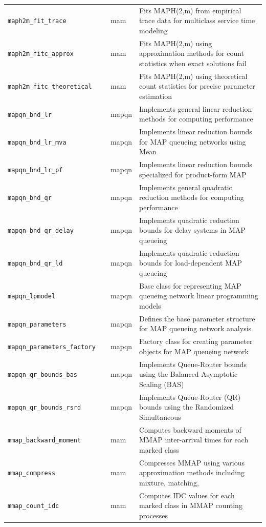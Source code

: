\begin{footnotesize}
\begin{longtable}{|p{0.4\linewidth}|p{0.1\linewidth}|p{0.5\linewidth}|}
\texttt{maph2m\_fit\_trace} & mam & Fits MAPH(2,m) from empirical trace data for multiclass service time modeling\\
\texttt{maph2m\_fitc\_approx} & mam & Fits MAPH(2,m) using approximation methods for count statistics when exact solutions fail\\
\texttt{maph2m\_fitc\_theoretical} & mam & Fits MAPH(2,m) using theoretical count statistics for precise parameter estimation\\
\texttt{mapqn\_bnd\_lr} & mapqn & Implements general linear reduction methods for computing performance\\
\texttt{mapqn\_bnd\_lr\_mva} & mapqn & Implements linear reduction bounds for MAP queueing networks using Mean\\
\texttt{mapqn\_bnd\_lr\_pf} & mapqn & Implements linear reduction bounds specialized for product-form MAP\\
\texttt{mapqn\_bnd\_qr} & mapqn & Implements general quadratic reduction methods for computing performance\\
\texttt{mapqn\_bnd\_qr\_delay} & mapqn & Implements quadratic reduction bounds for delay systems in MAP queueing\\
\texttt{mapqn\_bnd\_qr\_ld} & mapqn & Implements quadratic reduction bounds for load-dependent MAP queueing\\
\texttt{mapqn\_lpmodel} & mapqn & Base class for representing MAP queueing network linear programming models\\
\texttt{mapqn\_parameters} & mapqn & Defines the base parameter structure for MAP queueing network analysis\\
\texttt{mapqn\_parameters\_factory} & mapqn & Factory class for creating parameter objects for MAP queueing network\\
\texttt{mapqn\_qr\_bounds\_bas} & mapqn & Implements Queue-Router bounds using the Balanced Asymptotic Scaling (BAS)\\
\texttt{mapqn\_qr\_bounds\_rsrd} & mapqn & Implements Queue-Router (QR) bounds using the Randomized Simultaneous\\
\texttt{mmap\_backward\_moment} & mam & Computes backward moments of MMAP inter-arrival times for each marked class\\
\texttt{mmap\_compress} & mam & Compresses MMAP using various approximation methods including mixture, matching,\\
\texttt{mmap\_count\_idc} & mam & Computes IDC values for each marked class in MMAP counting processes\\

\end{longtable}
\end{footnotesize}
